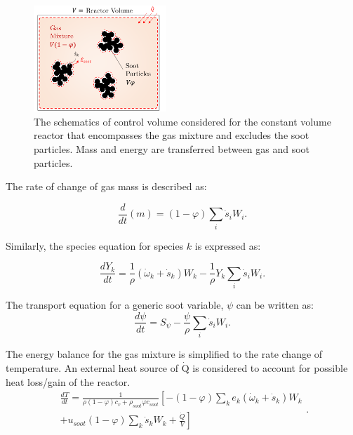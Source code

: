\begin{figure}[!htbp]
	\centering
	\includegraphics[height=40mm, ]{Figures/Theory/ConstUV.pdf}
	\caption{The schematics of control volume considered for the constant volume reactor that encompasses the gas mixture and excludes the soot particles. Mass and energy are transferred between gas and soot particles.}
	\label{fig:constuvcv}
\end{figure}
 
The rate of change of gas mass is described as:

\begin{equation}
	\frac{d}{dt}(m) =(1-\varphi) \sum_i \dot s_i W_i
	\label{eqn:contconstuv}.
\end{equation} 

Similarly, the species equation for species $k$ is expressed as:

\begin{equation}
	\frac{dY_k}{dt}
	=
	\frac{1}{\rho}
	\left(
		{\dot{\omega}}_k
		+
		{\dot{s}}_k
	\right)W_k
	-\frac{1}{\rho}Y_k\sum_{i}{{\dot{s}}_i W_i}
	\label{eqn:speciesconstuv}.
\end{equation}

The transport equation for a generic soot variable, $\psi$ can be written as:
\begin{equation}
	\frac{d \psi}{d t}= S_{\psi} - \frac{\psi}{\rho} \sum_i \dot{s}_i W_i
	\label{eqn:sootconstuv}.
\end{equation}

The energy balance for the gas mixture is simplified to the rate change of temperature. An external heat source of $\mathrm{\dot{Q}}$ is considered to account for possible heat loss/gain of the reactor.
\begin{equation}
	\begin{split}
		\frac{d T}{d t}=
		\frac{1}{\rho (1-\varphi) c_v+\rho_{soot}\varphi c_{soot}}
		\left[
			-(1-\varphi)\sum_k e_k
				\left(
					\dot{\omega}_k+\dot{s}_k
				\right) W_k
		\right. \\
		\left.
			+u_{soot}(1-\varphi)\sum_k \dot{s}_k W_k
			+\frac{\dot{Q}}{V}
		\right]
	\end{split}
	\label{eqn:energyconstuv}.
\end{equation}

